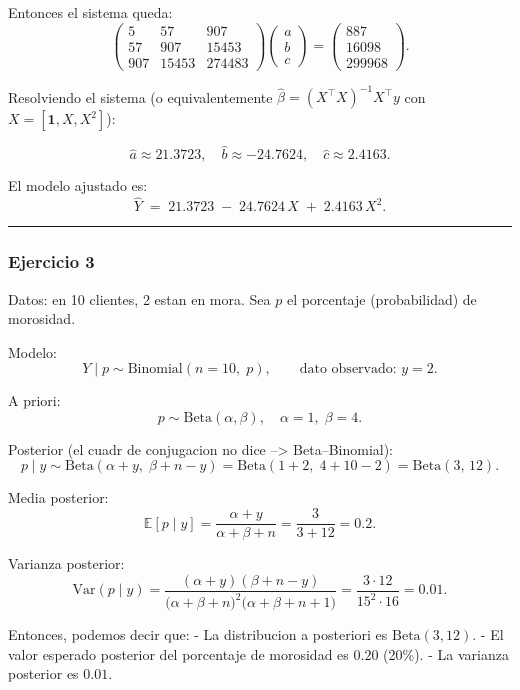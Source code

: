 \documentclass[11pt]{article}
\begin{document}
Entonces el sistema queda: \[
\begin{pmatrix}
5 & 57 & 907\\
57 & 907 & 15453\\
907 & 15453 & 274483
\end{pmatrix}
\begin{pmatrix} a\\ b\\ c \end{pmatrix}
=
\begin{pmatrix}
887\\ 16098\\ 299968
\end{pmatrix}.
\]

Resolviendo el sistema (o equivalentemente
\(\hat\beta=(X^\top X)^{-1}X^\top y\) con \(X=[\mathbf{1}, X, X^2]\)):

\[
\boxed{
\hat a \approx 21.3723,\quad
\hat b \approx -24.7624,\quad
\hat c \approx 2.4163.}
\]

El modelo ajustado es: \[
\hat Y \;=\; 21.3723\;-\;24.7624\,X\;+\;2.4163\,X^2.
\]

    \begin{center}\rule{0.5\linewidth}{0.5pt}\end{center}

\subsubsection{Ejercicio 3}\label{ejercicio-3}

Datos: en 10 clientes, 2 estan en mora. Sea \(p\) el porcentaje
(probabilidad) de morosidad.

Modelo: \[
Y \mid p \sim \mathrm{Binomial}(n=10,\;p), \qquad \text{dato observado: } y=2.
\]

A priori: \[
p \sim \mathrm{Beta}(\alpha,\beta), \quad \alpha=1,\; \beta=4.
\]

Posterior (el cuadr de conjugacion no dice --\textgreater{}
Beta--Binomial): \[
p \mid y \sim \mathrm{Beta}(\alpha+y,\;\beta+n-y)
= \mathrm{Beta}(1+2,\;4+10-2)
= \boxed{\mathrm{Beta}(3,\,12)}.
\]

Media posterior: \[
\mathbb{E}[p \mid y] = \frac{\alpha+y}{\alpha+\beta+n}
= \frac{3}{3+12} = \boxed{0.2}.
\]

Varianza posterior: \[
\mathrm{Var}(p \mid y) =
\frac{(\alpha+y)(\beta+n-y)}{\big(\alpha+\beta+n\big)^2 \big(\alpha+\beta+n+1\big)}
= \frac{3\cdot 12}{15^2 \cdot 16}
= \boxed{0.01}.
\]

Entonces, podemos decir que: - La distribucion a posteriori es
\(\mathrm{Beta}(3,12)\). - El valor esperado posterior del porcentaje de
morosidad es \(0.20\) (20\%). - La varianza posterior es \(0.01\).


    
    
    
\end{document}
